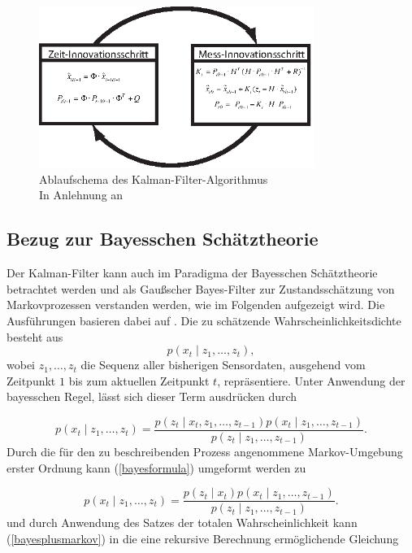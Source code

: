 \documentclass[12pt,a4paper,headsepline,bibliography=totoc,listof=totoc,headinclude=false,footinclude=false,BCOR5mm]{scrreprt} %
\begin{document}
\begin{figure}[h!]
    \centering
    \includegraphics[width=0.80\textwidth]{kalman}
\caption{Ablaufschema des Kalman-Filter-Algorithmus \\In Anlehnung an \cite[S. 24]{Welch2006} }\label{kalman}
\end{figure}

\subsection{Bezug zur Bayesschen Sch{\"a}tztheorie}
Der Kalman-Filter kann auch im Paradigma der Bayesschen Sch{\"a}tztheorie betrachtet werden und als Gau{\ss}scher Bayes-Filter zur Zustandssch{\"a}tzung von Markovprozessen verstanden werden, wie im Folgenden aufgezeigt wird. Die Ausf{\"u}hrungen basieren dabei auf \cite{Idler2005}. 
Die zu sch{\"a}tzende Wahrscheinlichkeitsdichte besteht aus
\begin{displaymath}p\left(x_{t}\mid z_{1}, \ldots, z_{t}\right),\end{displaymath} wobei $z_{1}, \ldots, z_{t}$ die Sequenz aller bisherigen Sensordaten, ausgehend vom Zeitpunkt $1$ bis zum aktuellen Zeitpunkt $t$, repr{\"a}sentiere. Unter Anwendung der bayesschen Regel, l{\"a}sst sich dieser Term ausdr{\"u}cken durch

\begin{equation}\label{bayesformula}
p\left(x_{t}\mid z_{1}, \ldots, z_{t}\right)=\frac{p\left(z_{t}\mid x_{t}, z_{1}, \ldots, z_{t-1}\right)p\left(x_{t}\mid z_{1}, \ldots, z_{t-1}\right)}{p\left(z_{t}\mid z_{1}, \ldots, z_{t-1}\right)}.
\end{equation} Durch die f{\"u}r den zu beschreibenden Prozess angenommene Markov-Umgebung erster Ordnung  kann (\ref{bayesformula}) umgeformt werden zu

\begin{equation}\label{bayesplusmarkov}
p\left(x_{t}\mid z_{1}, \ldots, z_{t}\right) =\frac{p\left(z_{t}\mid x_{t}\right)p\left(x_{t}\mid z_{1}, \ldots, z_{t-1}\right)}{p\left( z_{t}\mid z_{1}, \ldots, z_{t-1}\right)}.
\end{equation} und durch Anwendung des Satzes der totalen Wahrscheinlichkeit kann (\ref{bayesplusmarkov}) in die eine rekursive Berechnung erm{\"o}glichende Gleichung
\end{document}
